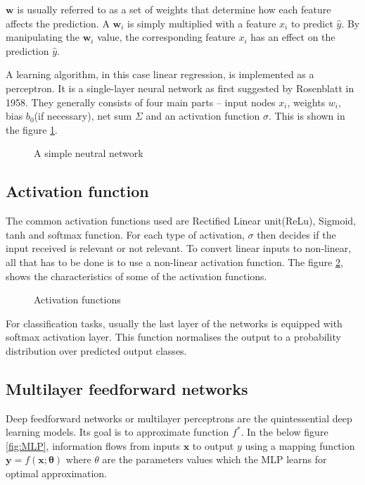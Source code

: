 $\mathbf{w}$ is usually referred to as a set of weights that determine how each feature
affects the prediction. A $\mathbf{w}_i$ is simply multiplied with a feature $x_i$ to
predict $\hat y$. By manipulating the $\mathbf{w}_i$ value, the corresponding feature $x_i$ has
an effect on the prediction  $\hat y$.

A learning algorithm, in this case linear regression, is implemented as a perceptron. It
is a single-layer neural network as first suggested by Rosenblatt in 1958. They generally consists of four main parts -- input
nodes $x_i$, weights $w_i$, bias $b_0$(if necessary), net sum $\Sigma$ and an activation
function $\sigma$. This is shown in the figure \ref{fig:simpleNN}.

\begin{figure}[h]
    \centering
        \def\svgwidth{0.5\textwidth}
        
        \caption{A simple neutral network}
        \label{fig:simpleNN}
\end{figure}

\subsection{Activation function}
\label{subsec:activationfunction}
The common activation functions used are Rectified Linear unit(ReLu), Sigmoid, tanh and
softmax function. For each type of activation, $\sigma$ then decides if the input received is
relevant or not relevant. To convert linear inputs to non-linear, all that has to be done
is to use a non-linear activation function. The figure \ref{fig:activationfunctions},
shows the characteristics of some of the activation functions.

\begin{figure}[h]
	\begin{center}
   \def\svgwidth{0.5\textwidth}
	\end{center}
    \caption{Activation functions}
    \label{fig:activationfunctions}
\end{figure}

For classification tasks, usually the last layer of the networks is equipped with softmax
activation layer. This function normalises the output to a probability distribution over
predicted output classes.

\subsection{Multilayer feedforward networks}
\label{subsec:MLP}
Deep feedforward networks or multilayer perceptrons are the quintessential deep learning
models. Its goal is to approximate function $f^*$. In the below figure \ref{fig:MLP},
information flows from inputs $\mathbf{x}$ to output $y$ using a mapping function
$\mathbf{y} = f(\mathbf{x};\mathbf{\theta})$ where $\theta$ are the parameters values
which the MLP learns for optimal approximation.

